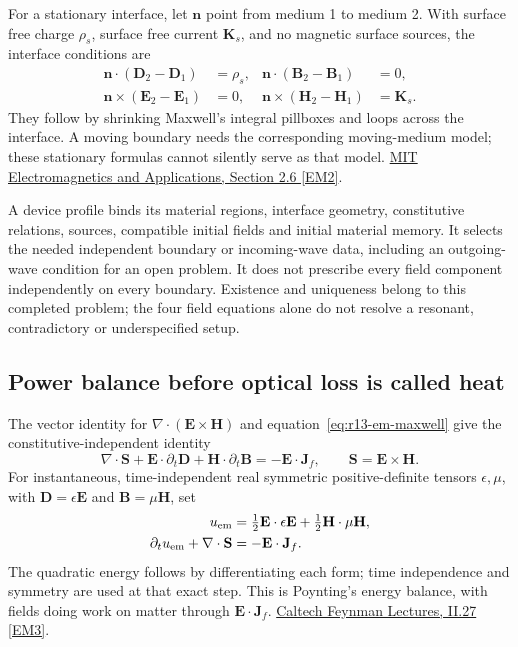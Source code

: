 For a stationary interface, let $\mathbf n$ point from medium 1 to medium 2.
With surface free charge $\rho_s$, surface free current $\mathbf K_s$, and
no magnetic surface sources, the interface conditions are
\begin{align}
 \mathbf n\cdot(\mathbf D_2-\mathbf D_1)&=\rho_s,&
 \mathbf n\cdot(\mathbf B_2-\mathbf B_1)&=0,\nonumber\\
 \mathbf n\times(\mathbf E_2-\mathbf E_1)&=0,&
 \mathbf n\times(\mathbf H_2-\mathbf H_1)&=\mathbf K_s.
 \label{eq:r13-em-boundary}
\end{align}
They follow by shrinking Maxwell's integral pillboxes and loops across the
interface. A moving boundary needs the corresponding moving-medium model;
these stationary formulas cannot silently serve as that model.
\href{https://live.ocw.mit.edu/courses/6-013-electromagnetics-and-applications-spring-2009/d3be4ea78b036a6362230fb41780cf54_MIT6_013S09_notes.pdf}{MIT Electromagnetics and Applications, Section 2.6 [EM2]}.

A device profile binds its material regions, interface geometry, constitutive
relations, sources, compatible initial fields and initial material memory.
It selects the needed independent boundary or incoming-wave data, including
an outgoing-wave condition for an open problem. It does not prescribe every
field component independently on every boundary. Existence and uniqueness
belong to this completed problem; the four field equations alone do not
resolve a resonant, contradictory or underspecified setup.

\subsection{Power balance before optical loss is called heat}
\label{sec:r13-em-energy}

The vector identity for $\nabla\cdot(\mathbf E\times\mathbf H)$ and
equation~\eqref{eq:r13-em-maxwell} give the constitutive-independent identity
\begin{equation}
 \nabla\cdot\mathbf S+\mathbf E\cdot\partial_t\mathbf D
 +\mathbf H\cdot\partial_t\mathbf B=-\mathbf E\cdot\mathbf J_f,
 \qquad \mathbf S=\mathbf E\times\mathbf H.
 \label{eq:r13-em-poynting-general}
\end{equation}
For instantaneous, time-independent real symmetric positive-definite tensors
$\epsilon,\mu$, with $\mathbf D=\epsilon\mathbf E$ and
$\mathbf B=\mu\mathbf H$, set
\begin{align}
 u_{\rm em}&=\tfrac12\mathbf E\cdot\epsilon\mathbf E+
             \tfrac12\mathbf H\cdot\mu\mathbf H,\nonumber\\
 \partial_tu_{\rm em}+\nabla\cdot\mathbf S
             &=-\mathbf E\cdot\mathbf J_f.
 \label{eq:r13-em-poynting-simple}
\end{align}
The quadratic energy follows by differentiating each form; time independence
and symmetry are used at that exact step. This is Poynting's energy balance,
with fields doing work on matter through $\mathbf E\cdot\mathbf J_f$.
\href{https://www.feynmanlectures.caltech.edu/II_27.html}{Caltech Feynman Lectures, II.27 [EM3]}.

